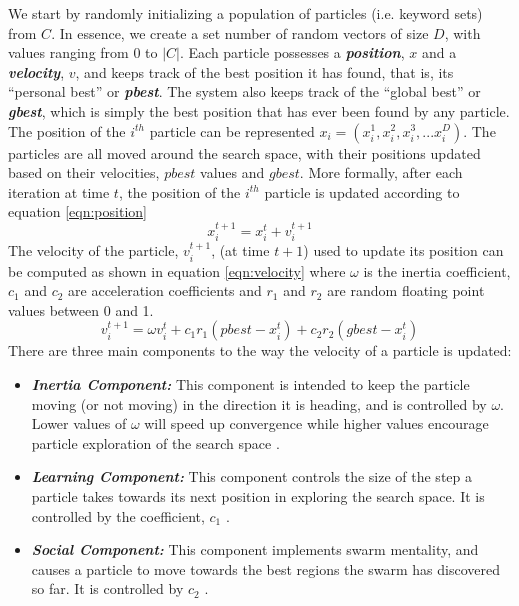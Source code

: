 \documentclass[runningheads]{llncs}
\begin{document}
We start by randomly initializing a population of particles (i.e. keyword sets) from $C$. In essence, we create a set number of random vectors of size $D$, with values ranging from $0$ to $|C|$. Each particle possesses a \textit{\textbf{position}}, $x$ and a \textit{\textbf{velocity}}, $v$, and keeps track of the best position it has found, that is, its ``personal best'' or \textit{\textbf{pbest}}. The system also keeps track of the ``global best'' or \textit{\textbf{gbest}}, which is simply the best position that has ever been found by any particle. The position of the $i^{th}$ particle can be represented $x_i = (x_i^1, x_i^2, x_i^3, ... x_i^D)$. The particles are all moved around the search space, with their positions updated based on their velocities, $pbest$ values and $gbest$. More formally, after each iteration at time $t$, the position of the $i^{th}$ particle is updated according to equation \ref{eqn:position} 
\begin{equation}
	x_i^{t+1} = x_i^t + v_i^{t+1}
	\label{eqn:position}
\end{equation}
The velocity of the particle, $v_i^{t+1}$, (at time $t+1$) used to update its position can be computed as shown in equation \ref{eqn:velocity} where $\omega$ is the inertia coefficient, $c_1$ and $c_2$ are acceleration coefficients and $r_1$ and $r_2$ are random floating point values between 0 and 1.
\begin{equation}
	v_i^{t+1} = \omega v_i^t + c_1r_1(pbest - x_i^t) + c_2r_2(gbest - x_i^t) 
	\label{eqn:velocity}
\end{equation}
There are three main components to the way the velocity of a particle is updated:
\begin{itemize}
	\item \textit{\textbf{Inertia Component:}} This component is intended to keep the particle moving (or not moving) in the direction it is heading, and is controlled by $\omega$. Lower values of $\omega$ will speed up convergence while higher values encourage particle exploration of the search space \cite{K_REF3}.
	
	\item \textit{\textbf{Learning Component:}} This component controls the size of the step a particle takes towards its next position in exploring the search space. It is controlled by the coefficient, $c_1$ \cite{K_REF4}. 
	
	\item \textit{\textbf{Social Component:}} This component implements swarm mentality, and causes a particle to move towards the best regions the swarm has discovered so far. It is controlled by $c_2$  \cite{K_REF4}.
\end{itemize}
\end{document}
